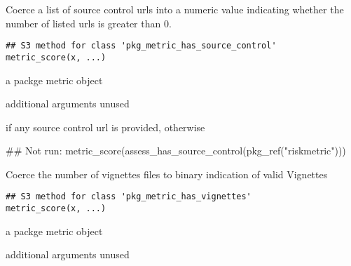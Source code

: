 \documentclass[a4paper]{book}
\begin{document}
%
\begin{Description}
Coerce a list of source control urls into a numeric value indicating whether
the number of listed urls is greater than 0.
\end{Description}
%
\begin{Usage}
\begin{verbatim}
## S3 method for class 'pkg_metric_has_source_control'
metric_score(x, ...)
\end{verbatim}
\end{Usage}
%
\begin{Arguments}
\begin{ldescription}
\item[\code{x}] a  packge metric object

\item[\code{...}] additional arguments unused
\end{ldescription}
\end{Arguments}
%
\begin{Value}
 if any source control url is provided, otherwise 
\end{Value}
%
\begin{Examples}
\begin{ExampleCode}
## Not run: metric_score(assess_has_source_control(pkg_ref("riskmetric")))

\end{ExampleCode}
\end{Examples}
%
\begin{Description}
Coerce the number of vignettes files to binary indication of valid Vignettes
\end{Description}
%
\begin{Usage}
\begin{verbatim}
## S3 method for class 'pkg_metric_has_vignettes'
metric_score(x, ...)
\end{verbatim}
\end{Usage}
%
\begin{Arguments}
\begin{ldescription}
\item[\code{x}] a  packge metric object

\item[\code{...}] additional arguments unused
\end{ldescription}
\end{Arguments}
\end{document}
